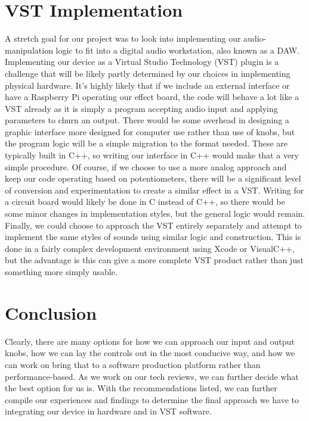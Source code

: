 \documentclass[onecolumn, draftclsnofoot,10pt, compsoc]{IEEEtran}
\begin{document}
\section{VST Implementation}
	A stretch goal for our project was to look into implementing our audio-manipulation logic to fit into a digital audio workstation, also known as a DAW. Implementing our device as a Virtual Studio Technology (VST) plugin is a challenge that will be likely partly determined by our choices in implementing physical hardware. It’s highly likely that if we include an external interface or have a Raspberry Pi operating our effect board, the code will behave a lot like a VST already as it is simply a program accepting audio input and applying parameters to churn an output. There would be some overhead in designing a graphic interface more designed for computer use rather than use of knobs, but the program logic will be a simple migration to the format needed. These are typically built in C++, so writing our interface in C++ would make that a very simple procedure. Of course, if we choose to use a more analog approach and keep our code operating based on potentiometers, there will be a significant level of conversion and experimentation to create a similar effect in a VST. Writing for a circuit board would likely be done in C instead of C++, so there would be some minor changes in implementation styles, but the general logic would remain. Finally, we could choose to approach the VST entirely separately and attempt to implement the same styles of sounds using similar logic and construction. This is done in a fairly complex development environment using Xcode or VisualC++, but the advantage is this can give a more complete VST product rather than just something more simply usable\cite{Plugin}. 
	
\section{Conclusion}
Clearly, there are many options for how we can approach our input and output knobs, how we can lay the controls out in the most conducive way, and how we can work on bring that to a software production platform rather than performance-based. As we work on our tech reviews, we can further decide what the best option for us is. With the recommendations listed, we can further compile our experiences and findings to determine the final approach we have to integrating our device in hardware and in VST software. 
\newpage


\end{document}
